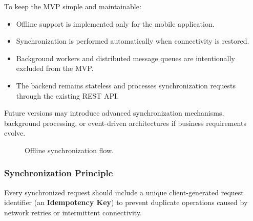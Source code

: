 \documentclass[11pt]{article}
\begin{document}
To keep the MVP simple and maintainable:

\begin{itemize}
    \item Offline support is implemented only for the mobile application.
    \item Synchronization is performed automatically when connectivity is
          restored.
    \item Background workers and distributed message queues are intentionally
          excluded from the MVP.
    \item The backend remains stateless and processes synchronization requests
          through the existing REST API.
\end{itemize}

Future versions may introduce advanced synchronization mechanisms, background
processing, or event-driven architectures if business requirements evolve.

\begin{figure}[htbp]
    \centering
    \caption{Offline synchronization flow.}
    \label{fig:offline-synchronization-flow}
\end{figure}

\subsubsection*{Synchronization Principle}

Every synchronized request should include a unique client-generated request
identifier (an \textbf{Idempotency Key}) to prevent duplicate operations caused
by network retries or intermittent connectivity.
\end{document}
